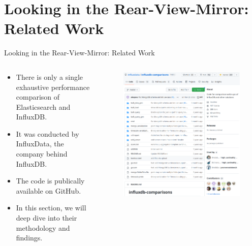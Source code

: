\documentclass[compress,aspectratio=169]{beamer}
\begin{document}
\section[Related Work]{Looking in the Rear-View-Mirror: Related Work}
\begin{frame}{Looking in the Rear-View-Mirror: Related Work}
\begin{columns}[T]
\begin{column}{0.5\textwidth}
\begin{itemize}
  \item There is only a single exhaustive performance comparison of Elasticsearch and InfluxDB.
  \item It was conducted by InfluxData, the company behind InfluxDB.
  \item The code is publically available on GitHub.
  \item In this section, we will deep dive into their methodology and findings.
\end{itemize}
\end{column}
\begin{column}{0.5\textwidth}
\begin{figure}
  \includegraphics[height=.8\textheight]{github_influx.png}
\end{figure}
\end{column}
\end{columns}
\end{frame}
\end{document}
